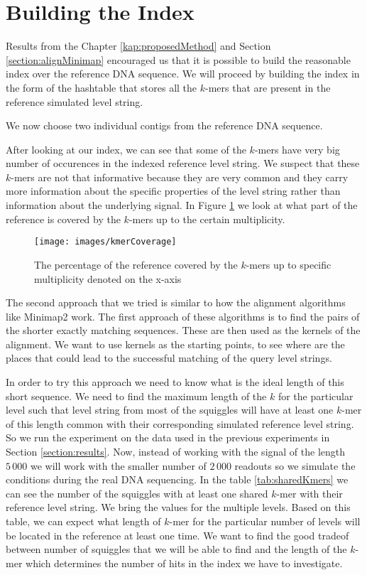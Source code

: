 \section{Building the Index}

Results from the Chapter \ref{kap:proposedMethod} and Section \ref{section:alignMinimap}
encouraged us that it is possible to build the reasonable index over the reference
DNA sequence. We will proceed by building the index in the form of the hashtable
that stores all the $k$-mers that are present in the reference simulated level string.

We now choose two individual contigs from the reference DNA sequence.

After looking at our index, we can see that some of the $k$-mers have very big
number of occurences in the indexed reference level string. We suspect that these
$k$-mers are not that informative because they are very common and they carry more
information about the specific properties of the level string rather than information
about the underlying signal. In Figure \ref{obr:kmerCoverage} we look at what part of the
reference is covered by the $k$-mers up to the certain multiplicity.

\begin{figure}
\centerline{\texttt{[image: images/kmerCoverage]}}
\caption[TODO]{The percentage of the reference covered by the $k$-mers up to specific multiplicity
denoted on the x-axis}
\label{obr:kmerCoverage}
\end{figure}


The second approach that we tried is similar to how the alignment algorithms like
Minimap2 work. The first approach of these algorithms is to find the pairs of the shorter
exactly matching sequences. These are then used as the kernels of the alignment. We want
to use kernels as the starting points, to see where are the places that could lead to the
successful matching of the query level strings.

In order to try this approach we need to know what is the ideal length of this short
sequence. We need to find the maximum length of the $k$ for the particular level
such that level string from most of the squiggles will have at least one $k$-mer
of this length common with their corresponding simulated reference level string.
So we run the experiment on the data used in the previous experiments in Section
\ref{section:results}. Now, instead of working with the signal of the length
$5\,000$ we will work with the smaller number of $2\,000$ readouts so we
simulate the conditions during the real DNA sequencing. In the table \ref{tab:sharedKmers}
we can see the number of the squiggles with at least one shared $k$-mer with their reference
level string. We bring the values for the multiple levels. Based on this table,
we can expect what length of $k$-mer for the particular number of levels will be located
in the reference at least one time. We want to find the good tradeof between number of
squiggles that we will be able to find and the length of the $k$-mer which determines
the number of hits in the index we have to investigate.

